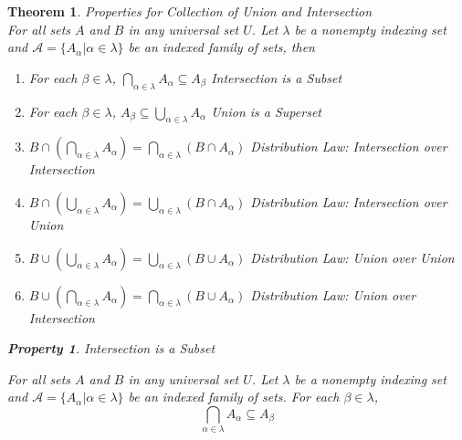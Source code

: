 \documentclass{book}
\newtheorem{theorem}{Theorem}[section]
\newtheorem{property}{Property}[theorem]
\theoremstyle{definition}
\theoremstyle{remark}
\newcommand{\cc}[1]{\mathcal{#1}}
\begin{document}
\newpage
\begin{theorem}
Properties for Collection of Union and Intersection \\

For all sets $A$ and $B$ in any universal set $U$. Let $\lambda$ be a nonempty indexing set and $\cc{A} = \{ A_{\alpha} | \alpha \in \lambda \}$ be an indexed family of sets, then 
    
    \begin{enumerate}
        \item For each $\beta \in \lambda$, $\bigcap_{\alpha \in \lambda}{A_{\alpha}} \subseteq A_{\beta}$ Intersection is a Subset %
        
        \item For each $\beta \in \lambda$, $A_{\beta} \subseteq \bigcup_{\alpha \in \lambda}{A_{\alpha}}$ Union is a Superset %
        
        \item $B \cap \left (\bigcap_{\alpha \in \lambda}{A_{\alpha}} \right ) = \bigcap_{\alpha \in \lambda}{(B \cap A_{\alpha})}$ Distribution Law: Intersection over Intersection %
        
        \item $B \cap \left (\bigcup_{\alpha \in \lambda}{A_{\alpha}} \right ) = \bigcup_{\alpha \in \lambda}{(B \cap A_{\alpha})}$ Distribution Law: Intersection over Union %
        
        \item $B \cup \left ( \bigcup_{\alpha \in \lambda}{A_{\alpha}} \right ) = \bigcup_{\alpha \in \lambda}{(B \cup A_{\alpha})}$ Distribution Law: Union over Union %
        
        \item $B \cup \left ( \bigcap_{\alpha \in \lambda}{A_{\alpha}} \right ) = \bigcap_{\alpha \in \lambda}{(B \cup A_{\alpha})}$ Distribution Law: Union over Intersection %
    \end{enumerate}



    \newpage
    \begin{property}
    Intersection is a Subset \\
        \begin{tcolorbox}
            For all sets $A$ and $B$ in any universal set $U$. Let $\lambda$ be a nonempty indexing set and $\cc{A} = \{ A_{\alpha} | \alpha \in \lambda \}$ be an indexed family of sets. For each $\beta \in \lambda$, 
                \begin{equation*}
                    \bigcap_{\alpha \in \lambda}{A_{\alpha}} \subseteq A_{\beta}
                \end{equation*}
        \end{tcolorbox}
    

\end{property}
\end{theorem}
\end{document}
